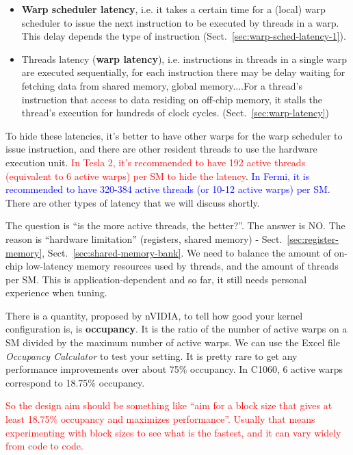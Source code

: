 
\begin{itemize}
\item {\bf Warp scheduler latency}, i.e. it takes a certain time for a
  (local) warp scheduler to issue the next instruction to be executed
  by threads in a warp. This delay depends the type of instruction
  (Sect.~\ref{sec:warp-sched-latency-1}). %

\item Threads latency ({\bf warp latency}), i.e. instructions in
  threads in a single warp are executed sequentially, for each
  instruction there may be delay waiting for fetching data from shared
  memory, global memory....For a thread's instruction that access to
  data residing on off-chip memory, it stalls the thread's execution
  for hundreds of clock cycles.
  (Sect.~\ref{sec:warp-latency})%
\end{itemize}
To hide these latencies, it's better to have other warps for the warp
scheduler to issue instruction, and there are other resident threads
to use the hardware execution unit.
\textcolor{red}{In Tesla 2, it's recommended to have 192 active
  threads (equivalent to 6 active warps) per SM to hide the latency}.
\textcolor{blue}{In Fermi, it is recommended to have 320-384 active
  threads (or 10-12 active warps) per SM}.
There are other types of latency that we will discuss shortly.

The question is ``is the more active threads, the better?''. The
answer is NO. The reason is ``hardware limitation'' (registers, shared
memory) - Sect.~\ref{sec:register-memory},
Sect.~\ref{sec:shared-memory-bank}. We need to balance the amount of
on-chip low-latency memory resources used by threads, and the amount
of threads per SM. This is application-dependent and so far, it still
needs personal experience when tuning.

\begin{framed}
  There is a quantity, proposed by nVIDIA, to tell how good your
  kernel configuration is, is {\bf occupancy}. It is the ratio of the
  number of active warps on a SM divided by the maximum number of
  active warps.  We can use the Excel file {\it Occupancy Calculator}
  to test your setting.  It is pretty rare to get any performance
  improvements over about 75\% occupancy. In C1060, 6 active warps
  correspond to 18.75\% occupancy.

  \textcolor{red}{So the design aim should be something like ``aim for
    a block size that gives at least 18.75\% occupancy and maximizes
    performance''. Usually that means experimenting with block sizes to
    see what is the fastest, and it can vary widely from code to
    code. }
\end{framed}


